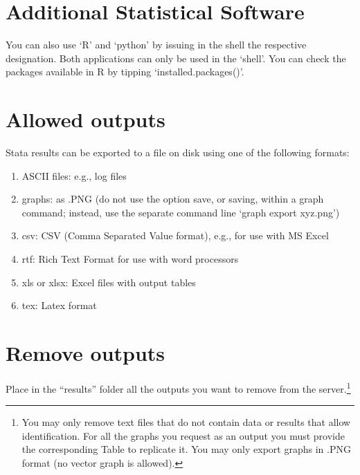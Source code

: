 \documentclass[]{book}
\let\rmarkdownfootnote\footnote%
\def\footnote{\protect\rmarkdownfootnote}
\begin{document}
\hypertarget{additional-statistical-software}{%
\section{\texorpdfstring{{Additional Statistical Software}}{Additional Statistical Software}}\label{additional-statistical-software}}

You can also use `R' and `python' by issuing in the shell the
respective designation. Both applications can only be used in the
`shell'. You can check the packages available in R by tipping
`installed.packages()'.

\hypertarget{allowed-outputs}{%
\section{\texorpdfstring{{Allowed outputs}}{Allowed outputs}}\label{allowed-outputs}}

Stata results can be exported to a file on disk using one of the following formats:

\begin{enumerate}
\def\labelenumi{\arabic{enumi}.}
\item
  ASCII files: e.g., log files
\item
  graphs: as .PNG (do not use the option save, or saving, within a
  graph command; instead, use the separate command line `graph export
  xyz.png')
\item
  csv: CSV (Comma Separated Value format), e.g., for use with MS Excel
\item
  rtf: Rich Text Format for use with word processors
\item
  xls or xlsx: Excel files with output tables
\item
  tex: Latex format
\end{enumerate}

\hypertarget{remove-outputs}{%
\section{\texorpdfstring{{Remove outputs}}{Remove outputs}}\label{remove-outputs}}

Place in the ``{results}'' folder all the outputs you want
to remove from the server.\footnote{You may only remove text files that do not contain data or results
  that allow identification. For all the graphs you request as an
  output you must provide the corresponding Table to replicate it. You
  may only export graphs in .PNG format (no vector graph is allowed).}
\end{document}
